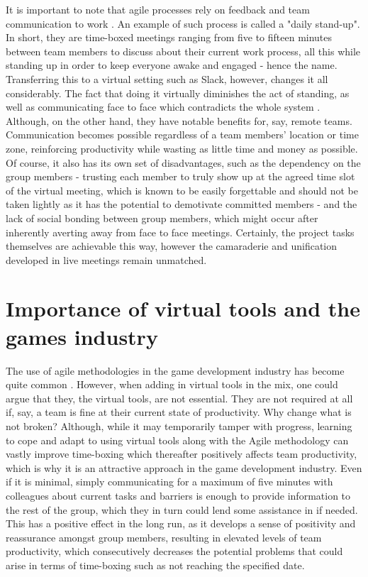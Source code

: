 \documentclass{scrartcl}
\begin{document}
It is important to note that agile processes rely on feedback and team communication to work \cite{Manifesto, Steve}. An example of such process is called a "daily stand-up". In short, they are time-boxed meetings ranging from five to fifteen minutes between team members to discuss about their current work process, all this while standing up in order to keep everyone awake and engaged - hence the name. \cite{McHugh} Transferring this to a virtual setting such as Slack, however, changes it all considerably. The fact that doing it virtually diminishes the act of standing, as well as communicating face to face which contradicts the whole system \cite{Lehmann}. Although, on the other hand, they have notable benefits for, say, remote teams. Communication becomes possible regardless of a team members' location or time zone, reinforcing productivity while wasting as little time and money as possible. Of course, it also has its own set of disadvantages, such as the dependency on the group members - trusting each member to truly show up at the agreed time slot of the virtual meeting, which is known to be easily forgettable and should not be taken lightly as it has the potential to demotivate committed members - and the lack of social bonding between group members, which might occur after inherently averting away from face to face meetings. \cite{Lehmann} Certainly, the project tasks themselves are achievable this way, however the camaraderie and unification developed in live meetings remain unmatched.

\section{Importance of virtual tools and the games industry}
The use of agile methodologies in the game development industry has become quite common \cite{Andre}. However, when adding in virtual tools in the mix, one could argue that they, the virtual tools, are not essential. They are not required at all if, say, a team is fine at their current state of productivity. Why change what is not broken? Although, while it may temporarily tamper with progress, learning to cope and adapt to using virtual tools along with the Agile methodology can vastly improve time-boxing which thereafter positively affects team productivity, which is why it is an attractive approach in the game development industry. Even if it is minimal, simply communicating for a maximum of five minutes with colleagues about current tasks and barriers is enough to provide information to the rest of the group, which they in turn could lend some assistance in if needed. This has a positive effect in the long run, as it develops a sense of positivity and reassurance amongst group members, resulting in elevated levels of team productivity, which consecutively decreases the potential problems that could arise in terms of time-boxing such as not reaching the specified date.
\end{document}
